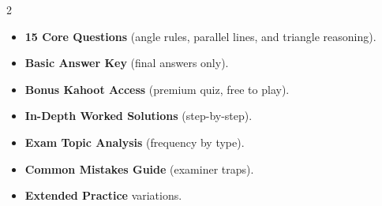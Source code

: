 \documentclass[11pt,a4paper]{article}
\newcommand{\FullReleaseDate}{April 30, 2026}
\begin{document}
\vspace{8pt}

\begin{multicols}{2}
  \begin{tcolorbox}[card, title=\sffamily\bfseries\textcolor{white}{\faHandPointDown\ TODAY (Simplified Version)}, colbacktitle=mainblue, boxed title style={sharp corners, boxrule=0pt}]
    \begin{itemize}[leftmargin=1.2em, itemsep=2pt]
      \item \small \textbf{15 Core Questions} (angle rules, parallel lines, and triangle reasoning).
      \item \small \textbf{Basic Answer Key} (final answers only).
      \item \small \textbf{Bonus Kahoot Access} (premium quiz, free to play).
    \end{itemize}
  \end{tcolorbox}

  \columnbreak

  \begin{tcolorbox}[card, title=\sffamily\bfseries\textcolor{white}{\faRocket\ ON \FullReleaseDate\ (Full Upgrade)}, colbacktitle=mainblue, boxed title style={sharp corners, boxrule=0pt}]
    \begin{itemize}[leftmargin=1.2em, itemsep=2pt]
      \item \small \textbf{In-Depth Worked Solutions} (step-by-step).
      \item \small \textbf{Exam Topic Analysis} (frequency by type).
      \item \small \textbf{Common Mistakes Guide} (examiner traps).
      \item \small \textbf{Extended Practice} variations.
    \end{itemize}
  \end{tcolorbox}
\end{multicols}
\end{document}
